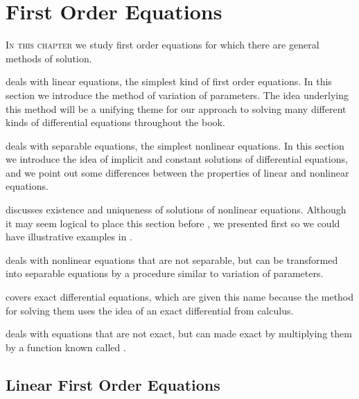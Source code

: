 
\chapter{First Order Equations}\label{ch:first_order}


\noindent
\textsc{In this chapter} we study
first order equations for which there are general methods of
solution.


\medskip\noindent
{} deals with linear
equations, the simplest kind
of first order equations. In this section we introduce the method of
variation of parameters. The idea underlying this method will be a
unifying theme for our approach to solving many different kinds of
differential equations throughout the book.

\medskip\noindent
{} deals with separable equations, the simplest
nonlinear equations. In this section we introduce the idea of implicit
and constant solutions of differential equations, and we point out
some differences between the properties of linear and nonlinear
equations.

\medskip\noindent
{} discusses existence and
uniqueness of solutions of nonlinear equations. Although it may seem
logical to place this section before , we
presented
 first so we could have illustrative examples in
.

\medskip\noindent
{} deals with nonlinear equations that
are not separable, but can be transformed into separable equations by a
procedure similar to variation of parameters.


\medskip\noindent
{} covers exact differential equations, which are
given this name because the method for solving them uses the idea of
an exact differential from calculus.


\medskip\noindent
{} deals with
equations that are not exact, but can made exact by multiplying them
by a function known called .

\newpage


\section{Linear First Order Equations}\label{sec:linear_first_order}

